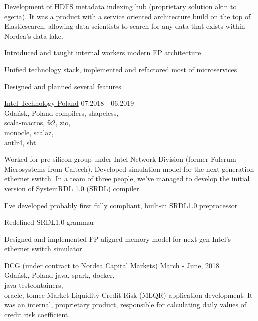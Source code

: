 \documentclass[a4paper,11pt]{cv4tw}%
\begin{document}
      {Development of HDFS metadata indexing hub (proprietary solution akin to \href{https://egeria.odpi.org}{egeria}).
        It was a product with a service oriented architecture build on the top of
        Elasticsearch, allowing data scientists to search for any data that exists
        within Nordea's data lake.
        \begin{missions}
        \item Introduced and taught internal workers modern FP architecture
        \item Unified technology stack, implemented and refactored most of microservices
        \item Designed and planned several features
        \end{missions}
      }
      {\href{https://www.intel.com/content/www/us/en/jobs/locations/poland.html}{Intel Technology Poland}}
      {07.2018 - 06.2019\\Gdańsk, Poland}
      {compilers, shapeless,\\scala-macros, fs2, zio,\\monocle, scalaz,\\antlr4, sbt}
      {Worked for pre-silicon group under Intel Network Division (former Fulcrum Microsystems from Caltech).
        Developed simulation model for the next generation ethernet switch. In a team of three people, we've
        managed to develop the initial version of
        \href{https://www.accellera.org/downloads/standards/systemrdl}{SystemRDL 1.0} (SRDL) compiler.
        \begin{missions}
        \item I've developed probably first fully compliant, built-in SRDL1.0 preprocessor
        \item Redefined SRDL1.0 grammar
        \item Designed and implemented FP-aligned memory model for next-gen Intel's ethernet switch simulator
        \end{missions}
      }
      {\href{https://diversecg.pl/}{DCG} (under contract to Nordea Capital Markets)}
      {March - June, 2018\\Gdańsk, Poland}
      {java, spark, docker,\\java-testcontainers,\\oracle, tomee}
      {Market Liquidity Credit Risk (MLQR) application development. It was an internal,
        proprietary product, responsible for calculating daily values of credit risk
        coefficient.
      }
\end{document}
